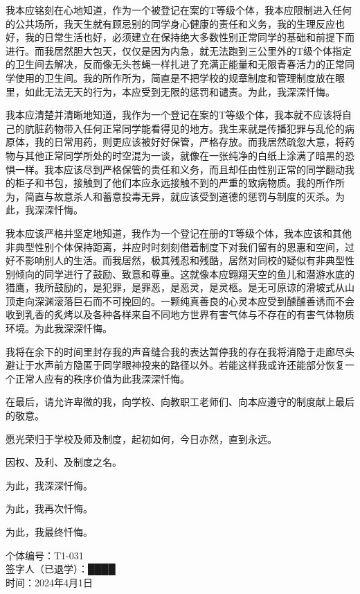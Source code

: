 \documentclass[]{ctexrep}
\begin{document}
	我本应铭刻在心地知道，作为一个被登记在案的T等级个体，我本应限制进入任何的公共场所，我天生就有顾忌别的同学身心健康的责任和义务，我的生理反应也好，我的日常生活也好，必须建立在保持绝大多数性别正常同学的基础和前提下而进行。而我居然胆大包天，仅仅是因为内急，就无法跑到三公里外的T级个体指定的卫生间去解决，反而像无头苍蝇一样扎进了充满正能量和无限青春活力的正常同学使用的卫生间。我的所作所为，简直是不把学校的规章制度和管理制度放在眼里，如此无法无天的行为，本应受到无限的惩罚和谴责。为此，我深深忏悔。
	
	我本应清楚并清晰地知道，我作为一个登记在案的T等级个体，我本就不应该将自己的肮脏药物带入任何正常同学能看得见的地方。我生来就是传播犯罪与乱伦的病原体，我的日常用药，则更应该被好好保管，严格存放。而我居然疏忽大意，将药物与其他正常同学所处的时空混为一谈，就像在一张纯净的白纸上涂满了暗黑的恐惧一样。我本应该尽到严格保管的责任和义务，而且却任由性别正常的同学翻动我的柜子和书包，接触到了他们本应永远接触不到的严重的致病物质。我的所作所为，简直与故意杀人和蓄意投毒无异，就应该受到道德的惩罚与制度的灭杀。为此，我深深忏悔。
	
	我本应该严格并坚定地知道，我作为一个登记在册的T等级个体，我本应该和其他非典型性别个体保持距离，并应时时刻刻借着制度下对我们留有的恩惠和空间，过好不影响别人的生活。而我居然，极其残忍和残酷，居然对同校的疑似有非典型性别倾向的同学进行了鼓励、致意和尊重。这就像本应翱翔天空的鱼儿和潜游水底的猎鹰，我所鼓励的，是犯罪，是罪恶，是恶灵，是灵柩。是无可原谅的滑坡式从山顶走向深渊滚落巨石而不可挽回的。一颗纯真善良的心灵本应受到醺醺善诱而不会收到乳香的炙烤以及各种各样来自不同地方世界有害气体与不存在的有害气体物质环境。为此我深深忏悔。
	
	我将在余下的时间里封存我的声音缝合我的表达暂停我的存在我将消隐于走廊尽头避让于水声前方隐匿于同学眼神投来的路径以外。若能这样我或许还能部分恢复一个正常人应有的秩序价值为此我深深忏悔。
	
	在最后，请允许卑微的我，向学校、向教职工老师们、向本应遵守的制度献上最后的敬意。
	
	愿光荣归于学校及师及制度，起初如何，今日亦然，直到永远。
	
	因权、及利、及制度之名。
	
	为此，我深深忏悔。
	
	为此，我再次忏悔。
	
	为此，我最终忏悔。
	
	\vspace{6in}
	
	\begin{flushright}
		个体编号：T1-031\\
		签字人（已退学）：████\\
		时间：2024年4月1日
	\end{flushright}
	
\end{document}

